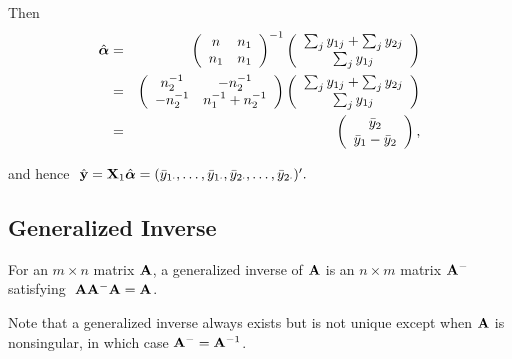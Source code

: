 Then 
\begin{eqnarray*}
\hat{\mbox{\boldmath $\alpha$}}
	 & = & \left(\begin{array}{cc}n&n_1\\n_1&n_1\end{array}\right)^{-1}
		\left(\begin{array}{c}
			\sum_j y_{1j}+\sum_j y_{2j}\\\sum_j y_{1j}
		\end{array}\right)\\
	 &=&  \left(\begin{array}{cc}
		n_2^{-1}&-n_2^{-1}\\-n_2^{-1}&n_1^{-1}+n_2^{-1}
		\end{array}\right)
		\left(\begin{array}{c}
			\sum_j y_{1j}+\sum_j y_{2j}\\\sum_j y_{1j}
		\end{array}\right)\\
	 & = & \left(\begin{array}{c}
			\bar{y}_2\\\bar{y}_1-\bar{y}_2
		\end{array}\right),
\end{eqnarray*}

and hence
$
\ \hat{\mathbf{y}}=\mathbf{X}_1\hat{\mbox{\boldmath $\alpha$}}= (\bar{y}_{1\cdot}, \ldots,
\bar{y}_{1\cdot}, \bar{y}_{2\cdot}, \ldots, \bar{y}_{2\cdot})'.
$

\eexa

\newpage
\subsection{Generalized Inverse}

\vb
\bsdefi 
For an $m \times n$ matrix $\mathbf{A}$, a generalized inverse of $\mathbf{A}$ is an $n
\times m$ matrix $\mathbf{A}^{-}$ satisfying $\ \mathbf{A}\mathbf{A}^{-}\mathbf{A} = \mathbf{A}$.
\esdefi 

Note that a generalized inverse always exists but is not unique except when $\mathbf{A}$ is nonsingular, in which case $\mathbf{A}^{-} = \mathbf{A}^{-1}$.



